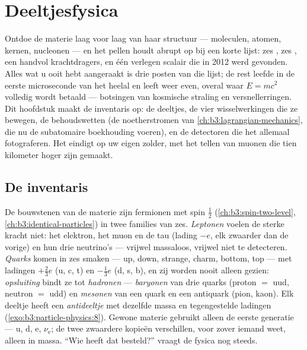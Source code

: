 \chapter{Deeltjesfysica}\label{ch:b3:particle-physics}


Ontdoe de materie laag voor laag van haar structuur --- moleculen, atomen,
kernen, nucleonen --- en het pellen houdt abrupt op bij een korte lijst:
zes \emph{}, zes \emph{}, een handvol krachtdragers,
en één verlegen scalair die in 2012 werd gevonden. Alles wat u ooit hebt aangeraakt is
drie posten van die lijst; de rest leefde in de eerste microseconde van
het heelal en leeft weer even, overal waar
$E = mc^2$ volledig wordt betaald --- botsingen van kosmische straling en
versnellerringen. Dit hoofdstuk maakt de inventaris op: de deeltjes, de vier
wisselwerkingen die ze bewegen, de behoudswetten
(de noetherstromen van \cref{ch:b3:lagrangian-mechanics}, die nu de
subatomaire boekhouding voeren), en de detectoren die het allemaal fotograferen. Het
eindigt op uw eigen zolder, met het tellen van muonen die tien kilometer hoger zijn gemaakt.

\section{De inventaris}

\begin{definition}\label{def:b3:particle-physics:zoo}
De bouwstenen van de materie zijn fermionen met spin $\tfrac12$
(\cref{ch:b3:spin-two-level}, \cref{ch:b3:identical-particles}) in
twee families van zes. \emph{Leptonen} voelen de sterke kracht niet: het
elektron, het muon en de tau (lading $-e$, elk zwaarder dan de vorige)
en hun drie neutrino's --- vrijwel massaloos, vrijwel
niet te detecteren. \emph{Quarks} komen in zes smaken --- up, down,
strange, charm, bottom, top --- met ladingen $+\tfrac23e$ (u, c,
t) en $-\tfrac13e$ (d, s, b), en zij worden nooit alleen gezien:
\emph{opsluiting} bindt ze tot \emph{hadronen} --- \emph{baryonen} van
drie quarks (proton $=$ uud, neutron $=$ udd) en
\emph{mesonen} van een quark en een antiquark (pion, kaon). Elk deeltje heeft een
\emph{antideeltje} met dezelfde massa en tegengestelde ladingen
(\cref{exo:b3:particle-physics:8}). Gewone materie gebruikt alleen de
eerste generatie --- u, d, e, $\nu_{\text{e}}$; de twee zwaardere
kopieën verschillen, voor zover iemand weet, alleen in massa. ``Wie
heeft dat besteld?'' vraagt de fysica nog steeds.
\end{definition}

